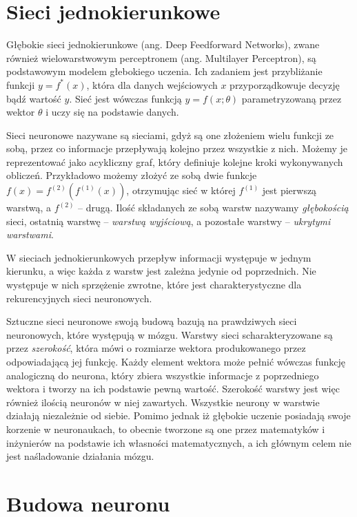 \documentclass[licencjacka]{pracamgr}
\begin{document}
\section{Sieci jednokierunkowe}

Głębokie sieci jednokierunkowe (ang. Deep Feedforward Networks), zwane również wielowarstwowym perceptronem (ang. Multilayer Perceptron), są podstawowym modelem głebokiego uczenia. Ich zadaniem jest przybliżanie funkcji $ y = f^{\ast}(x) $, która dla danych wejściowych $x$ przyporządkowuje decyzję bądź wartość $y$. Sieć jest wówczas funkcją $ y = f(x; \theta) $ parametryzowaną przez wektor $\theta$ i uczy się na podstawie danych.

Sieci neuronowe nazywane są sieciami, gdyż są one złożeniem wielu funkcji ze sobą, przez co informacje przepływają kolejno przez wszystkie z nich. Możemy je reprezentować jako acykliczny graf, który definiuje kolejne kroki wykonywanych obliczeń. Przykładowo możemy złożyć ze sobą dwie funkcje $ f(x) = f^{(2)}(f^{(1)}(x)) $, otrzymując sieć w której $f^{(1)} $ jest pierwszą warstwą, a $ f^{(2)} $ -- drugą. Ilość składanych ze sobą warstw nazywamy \emph{głębokością} sieci, ostatnią warstwę -- \emph{warstwą wyjściową}, a pozostałe warstwy -- \emph{ukrytymi warstwami}. 

W sieciach jednokierunkowych przepływ informacji występuje w jednym kierunku, a więc każda z warstw jest zależna jedynie od poprzednich. Nie występuje w nich sprzężenie zwrotne, które jest charakterystyczne dla rekurencyjnych sieci neuronowych.

Sztuczne sieci neuronowe swoją budową bazują na prawdziwych sieci neuronowych, które występują w mózgu. Warstwy sieci scharakteryzowane są przez \emph{szerokość}, która mówi o rozmiarze wektora produkowanego przez odpowiadającą jej funkcję. Każdy element wektora może pełnić wówczas funkcję analogiczną do neurona, który zbiera wszystkie informacje z poprzedniego wektora i tworzy na ich podstawie pewną wartość. Szerokość warstwy jest więc również ilością neuronów w niej zawartych. Wszystkie neurony w warstwie działają niezależnie od siebie. Pomimo jednak iż głębokie uczenie posiadają swoje korzenie w neuronaukach, to obecnie tworzone są one przez matematyków i inżynierów na podstawie ich własności matematycznych, a ich głównym celem nie jest naśladowanie działania mózgu.

\section{Budowa neuronu}
\end{document}
